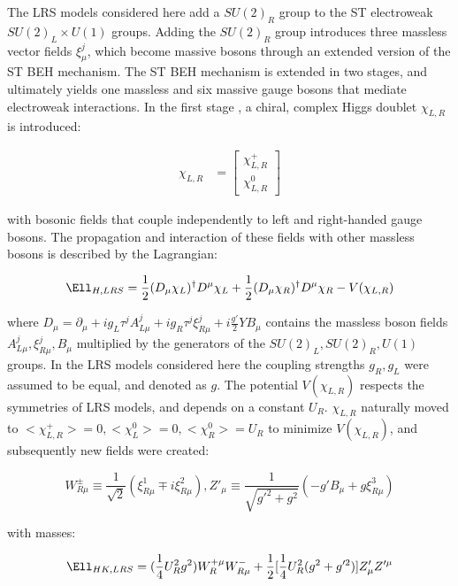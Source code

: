 The LRS models considered here add a $SU(2)_{R}$ group to the ST electroweak $SU(2)_{L} \times U(1)$ groups.
Adding the $SU(2)_{R}$ group introduces three massless vector fields $\xi^{j}_{\mu}$, which become massive 
bosons through an extended version of the ST BEH mechanism.  The ST BEH mechanism is extended in two stages, 
and ultimately yields one massless and six massive gauge bosons that mediate electroweak interactions.  In 
the first stage \cite{lrsHiggsStageOne}, a chiral, complex Higgs doublet $\chi_{L,R}$ is introduced: 

\begin{align}
	\chi_{L,R} &= \begin{bmatrix}
	\chi^{+}_{L,R} \\
	\chi^{0}_{L,R}
	\end{bmatrix}
	\label{eq:stageOneVEV}
\end{align}

with bosonic fields that couple independently to left and right-handed gauge bosons.  The propagation and 
interaction of these fields with other massless bosons is described by the Lagrangian:

\begin{equation}
	\Ell_{H,LRS} = \frac{1}{2}(D_{\mu}\chi_{L})^{\dagger}D^{\mu}\chi_{L} + \frac{1}{2}(D_{\mu}\chi_{R})^{\dagger}D^{\mu}\chi_{R} - V(\chi_{L,R})
\end{equation}

where $D_{\mu} = \partial_{\mu} + ig_{L}\tau^{j}A^{j}_{L\mu} + ig_{R}\tau^{j}\xi^{j}_{R\mu} + i\frac{g'}{2}YB_{\mu}$ contains 
the massless boson fields $A^{j}_{L\mu}, \xi^{j}_{R\mu}, B_{\mu}$ multiplied by the generators of the $SU(2)_{L}, SU(2)_{R}, U(1)$ groups.  
In the LRS models considered here the coupling strengths $g_{R}, g_{L}$ were assumed to be equal, and denoted as $g$.  
The potential $V(\chi_{L,R})$ respects the symmetries of LRS models, and depends on a constant $U_{R}$.  $\chi_{L,R}$ 
naturally moved to $<\chi^{+}_{L,R}> = 0, <\chi^{0}_{L}> = 0, <\chi^{0}_{R}> = U_{R}$ to minimize $V(\chi_{L,R})$, 
and subsequently new fields were created:

\begin{equation}
	W^{\pm}_{R\mu} \equiv \frac{1}{\sqrt{2}}(\xi^{1}_{R\mu} \mp i\xi^{2}_{R\mu}), 
	Z'_{\mu} \equiv \frac{1}{\sqrt{g'^{2} + g^{2}}}(-g'B_{\mu} + g\xi^{3}_{R\mu})
\end{equation}

with masses:

\begin{equation}
	\Ell_{HK,LRS} = (\frac{1}{4}U^{2}_{R}g^{2})W^{+\mu}_{R}W^{-}_{R\mu} + \frac{1}{2}[\frac{1}{4}U^{2}_{R}(g^{2} + g'^{2})]Z'_{\mu}Z'^{\mu}
\end{equation}

